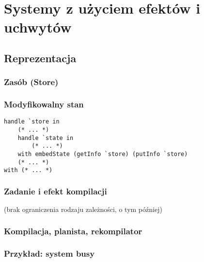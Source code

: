 
\section{Systemy z użyciem efektów i uchwytów}

\lstset{language=Haleff, showstringspaces=false, inputpath=../src}

\subsection{Reprezentacja}

\begin{frame}[fragile]
  \frametitle{Zasób (Store)}

  
  
\end{frame}

\begin{frame}[fragile]
  \frametitle{Modyfikowalny stan}
  

  \begin{lstlisting}[language=Haleff]
handle `store in
    (* ... *)
    handle `state in
        (* ... *)
    with embedState (getInfo `store) (putInfo `store)
    (* ... *)
with (* ... *)
\end{lstlisting}
\end{frame}

\begin{frame}[fragile]
  \frametitle{Zadanie i efekt kompilacji}

  

  \vspace{1em}
  {\small (brak ograniczenia rodzaju zależności, o tym później)}
\end{frame}

\begin{frame}[fragile]
  \frametitle{Kompilacja, planista, rekompilator}
  
  
\end{frame}

\begin{frame}[fragile]
  \frametitle{Przykład: system busy}
  
\end{frame}

